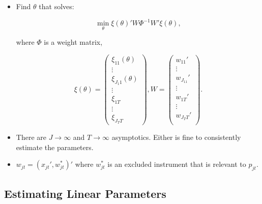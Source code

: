 \documentclass[]{book}
\providecommand{\tightlist}{%
  \setlength{\itemsep}{0pt}\setlength{\parskip}{0pt}}
\begin{document}
\begin{itemize}
\tightlist
\item
  Find \(\theta\) that solves:

  \begin{equation}
  \min_{\theta} \xi(\theta)' W \Phi^{-1} W' \xi(\theta),
  \end{equation}

  where \(\Phi\) is a weight matrix,

  \begin{equation}
  \xi(\theta) = 
  \begin{pmatrix}
  \xi_{11}(\theta)\\
  \vdots\\
  \xi_{J_1 1}(\theta)\\
  \vdots\\
  \xi_{1T} \\
  \vdots\\
  \xi_{J_T T}
  \end{pmatrix},
  W = 
  \begin{pmatrix}
  w_{11}' \\
  \vdots \\
  w_{J_11}' \\
  \vdots \\
  w_{1T}' \\
  \vdots \\
  w_{J_TT}' \\
  \end{pmatrix}.
  \end{equation}
\item
  There are \(J \to \infty\) and \(T \to \infty\) asymptotics. Either is
  fine to consistently estimate the parameters.
\item
  \(w_{jt} = (x_{jt}', w_{jt}^*)'\) where \(w_{jt}^*\) is an excluded
  instrument that is relevant to \(p_{jt}\).
\end{itemize}

\subsection{Estimating Linear
Parameters}\label{estimating-linear-parameters}
\end{document}
